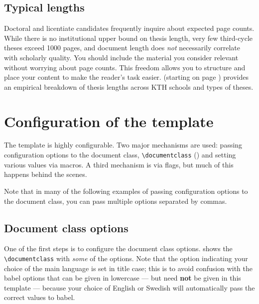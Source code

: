 \documentclass[12pt, twoside]{article}
\begin{document}
\subsection{Typical lengths}
\label{sec:typicalThesisLengths}
Doctoral and licentiate candidates frequently inquire about expected page counts. While there is no institutional upper bound on thesis length, very few third-cycle theses exceed \num{1000} pages, and document length does \emph{not} necessarily correlate with scholarly quality. You should include the material you consider relevant without worrying about page counts. This freedom allows you to structure and place your content to make the reader's task easier.  (starting on page \pageref{sec:advancedThesisLengths}) provides an empirical breakdown of thesis lengths across \gls{KTH} schools and types of theses.

\section{Configuration of the template}
\label{sec:cycle3authorConfigs}
The template is highly configurable. Two major mechanisms are used: passing configuration options to the document class, \ie \texttt{\textbackslash documentclass} () and setting various values via macros. A third mechanism is via flags, but much of this happens behind the scenes.

Note that in many of the following examples of passing configuration options to the document class, you can pass multiple options separated by commas.

\subsection{Document class options}
\label{sec:SettingDocClassOptions}
One of the first steps is to configure the document class options.  shows the \texttt{\textbackslash documentclass} with \textit{some} of the options. Note that the option indicating your choice of the main language is set in title case; this is to avoid confusion with the babel options that can be given in lowercase --- but need \textbf{not} be given in this template --- because your choice of English or Swedish will automatically pass the correct values to babel.
\end{document}
